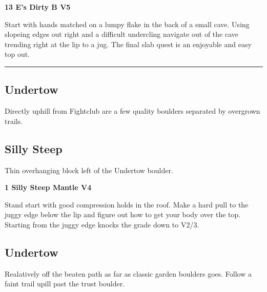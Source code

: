\begin{multicols}{2}
					\begin{minipage}{\linewidth}	
					\label{rt:E's Dirty B}
\colorbox{RoyalBlue!20}{
\textbf{
13 E's Dirty B V5    
}
}

					\begin{adjustwidth}{0.5cm}{}				
					Start with hands matched on a lumpy flake in the back of a small cave. Using slopeing edges out right and a difficult undercling navigate out of the cave trending right at the lip to a jug. The final slab quest is an enjoyable and easy top out.
					\end{adjustwidth}
					\end{minipage}
\end{multicols}
\rule{\textwidth}{1pt}
\begin{multicols}{2}
		\section{Undertow}\label{sa:Undertow}
	\begin{minipage}{\columnwidth}
	Directly uphill from Fightclub are a few quality boulders separated by overgrown trails.
	\end{minipage}

			\subsection*{Silly Steep}\label{bf:Silly Steep}
			\begin{minipage}{\columnwidth}
			Thin overhanging block left of the Undertow boulder.
			\end{minipage}
			

					\begin{minipage}{\linewidth}	
					\label{rt:Silly Steep Mantle}
\colorbox{RoyalBlue!20}{
\textbf{
1 Silly Steep Mantle V4    
}
}

					\begin{adjustwidth}{0.5cm}{}				
					Stand start with good compression holds in the roof. Make a hard pull to the juggy edge below the lip and figure out how to get your body over the top. Starting from the juggy edge knocks the grade down to V2/3.
					\end{adjustwidth}
					\end{minipage}
			\subsection*{Undertow}\label{bf:Undertow}
			\begin{minipage}{\columnwidth}
			Realatively off the beaten path as far as classic garden boulders goes. Follow a faint trail upill past the trust boulder.
			\end{minipage}
			

\end{multicols}
